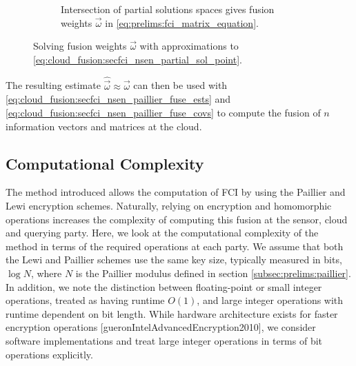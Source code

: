 \begin{figure}[htbp]
\begin{subfigure}[htbp]{\textwidth}
\begin{center}
        \end{center}
        \caption{Intersection of partial solutions spaces gives fusion weights $\vec{\omega}$ in \eqref{eq:prelims:fci_matrix_equation}.}
        \label{fig:3sen_planes}
    \end{subfigure}
    \caption{Solving fusion weights $\vec{\omega}$ with approximations to \eqref{eq:cloud_fusion:secfci_nsen_partial_sol_point}.}
    \label{fig:cloud_fusion:secfci_nsen_partial_sols_and_intersect}
\end{figure}

The resulting estimate $\hat{\vec{\omega}} \approx \vec{\omega}$ can then be used with \eqref{eq:cloud_fusion:secfci_nsen_paillier_fuse_ests} and \eqref{eq:cloud_fusion:secfci_nsen_paillier_fuse_covs} to compute the fusion of $n$ information vectors and matrices at the cloud.

% 
% 

\subsection{Computational Complexity}\label{subsec:cloud_fusion:secfci_comp_complexity}
The method introduced allows the computation of FCI by using the Paillier and Lewi encryption schemes. Naturally, relying on encryption and homomorphic operations increases the complexity of computing this fusion at the sensor, cloud and querying party. Here, we look at the computational complexity of the method in terms of the required operations at each party. We assume that both the Lewi and Paillier schemes use the same key size, typically measured in bits, $\log{N}$, where $N$ is the Paillier modulus defined in section \ref{subsec:prelims:paillier}. In addition, we note the distinction between floating-point or small integer operations, treated as having runtime $O(1)$, and large integer operations with runtime dependent on bit length. While hardware architecture exists for faster encryption operations [gueronIntelAdvancedEncryption2010], we consider software implementations and treat large integer operations in terms of bit operations explicitly.

